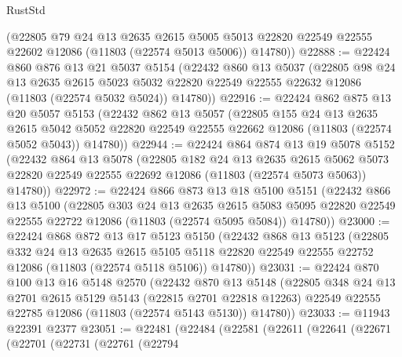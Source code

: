 \begin{lexlean}{RustStd}
\begin{coremodule}
      (@22805
        @79
        @24
        @13
        @2635
        @2615
        @5005
        @5013
        @22820
        @22549
        @22555
        @22602
        @12086
        (@11803 (@22574 @5013 @5006))
        @14780))
@22888 := @22424
    @860
    @876
    @13
    @21
    @5037
    @5154
    (@22432
      @860
      @13
      @5037
      (@22805
        @98
        @24
        @13
        @2635
        @2615
        @5023
        @5032
        @22820
        @22549
        @22555
        @22632
        @12086
        (@11803 (@22574 @5032 @5024))
        @14780))
@22916 := @22424
    @862
    @875
    @13
    @20
    @5057
    @5153
    (@22432
      @862
      @13
      @5057
      (@22805
        @155
        @24
        @13
        @2635
        @2615
        @5042
        @5052
        @22820
        @22549
        @22555
        @22662
        @12086
        (@11803 (@22574 @5052 @5043))
        @14780))
@22944 := @22424
    @864
    @874
    @13
    @19
    @5078
    @5152
    (@22432
      @864
      @13
      @5078
      (@22805
        @182
        @24
        @13
        @2635
        @2615
        @5062
        @5073
        @22820
        @22549
        @22555
        @22692
        @12086
        (@11803 (@22574 @5073 @5063))
        @14780))
@22972 := @22424
    @866
    @873
    @13
    @18
    @5100
    @5151
    (@22432
      @866
      @13
      @5100
      (@22805
        @303
        @24
        @13
        @2635
        @2615
        @5083
        @5095
        @22820
        @22549
        @22555
        @22722
        @12086
        (@11803 (@22574 @5095 @5084))
        @14780))
@23000 := @22424
    @868
    @872
    @13
    @17
    @5123
    @5150
    (@22432
      @868
      @13
      @5123
      (@22805
        @332
        @24
        @13
        @2635
        @2615
        @5105
        @5118
        @22820
        @22549
        @22555
        @22752
        @12086
        (@11803 (@22574 @5118 @5106))
        @14780))
@23031 := @22424
    @870
    @100
    @13
    @16
    @5148
    @2570
    (@22432
      @870
      @13
      @5148
      (@22805
        @348
        @24
        @13
        @2701
        @2615
        @5129
        @5143
        (@22815 @2701 @22818 @12263)
        @22549
        @22555
        @22785
        @12086
        (@11803 (@22574 @5143 @5130))
        @14780))
@23033 := @11943 @22391 @2377
@23051 := @22481
    (@22484
      (@22581
        (@22611
          (@22641
            (@22671
              (@22701
                (@22731
                  (@22761
                    (@22794

\end{coremodule}
\end{lexlean}
